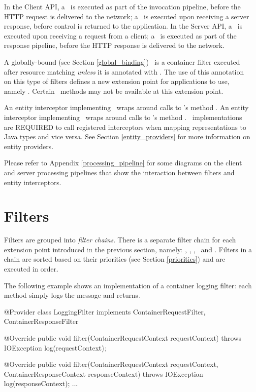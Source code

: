 In the Client API, a \ClientRequestFilter\ is executed as part of the invocation pipeline, before the HTTP request is delivered to the network; a \ClientResponseFilter\ is executed upon receiving a server response, before control is returned to the application. 
In the Server API, a \ContainerRequestFilter\ is executed upon receiving a request from a client; a \ContainerResponseFilter\ is executed as part of the response pipeline, before the HTTP response is delivered to the network. 

A globally-bound (see Section \ref{global_binding}) \ContainerRequestFilter\ is a container filter executed after resource matching {\em unless} it is annotated with \PreMatching. The use of this annotation on this type of filters defines a new extension point for applications to use, namely \PreMatchContainerRequest. Certain \ContainerRequestContext\ methods may not be available at this extension point. 

An entity interceptor implementing \ReaderInterceptor\ wraps around calls to 's method . An entity interceptor implementing \WriterInterceptor\ wraps around calls to 's method . \jaxrs\ implementations are REQUIRED to call registered interceptors when mapping representations to Java types and vice versa. See Section \ref{entity_providers} for more information on entity providers.

Please refer to Appendix \ref{processing_pipeline} for some diagrams on the client and server processing pipelines that show the interaction between filters and entity interceptors.

\section{Filters}
\label{filters}

Filters are grouped into \emph{filter chains}. There is a separate filter chain for each extension point introduced in the previous section, namely: \ClientRequest, \ClientResponse, \ContainerRequest, \ContainerResponse\ and \PreMatchContainerRequest. Filters in a chain are sorted based on their priorities (see Section \ref{priorities}) and are executed in order. 

The following example shows an implementation of a container logging filter: each method simply logs the message and returns.

\begin{listing}{1}
@Provider
class LoggingFilter implements ContainerRequestFilter, 
                               ContainerResponseFilter {

    @Override
    public void filter(ContainerRequestContext requestContext) 
        throws IOException {
        log(requestContext);
    }

    @Override
    public void filter(ContainerRequestContext requestContext, 
        ContainerResponseContext responseContext) throws IOException {
        log(responseContext);
    }
    ...
}
\end{listing}

